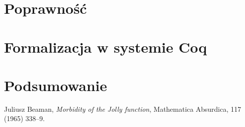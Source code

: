 \documentclass[]{pracamgr}
\renewcommand \| {\hspace{0.75em} | \hspace{0.75em} }
\renewcommand \[ {[\![}
\renewcommand \] {]\!]}
\begin{document}
\chapter{Poprawność}

\chapter{Formalizacja w systemie Coq}

\chapter{Podsumowanie}

\appendix
\begin{thebibliography}{99}

 Juliusz Beaman, \textit{Morbidity of the Jolly
    function}, Mathematica Absurdica, 117 (1965) 338--9.

\end{thebibliography}
\end{document}
